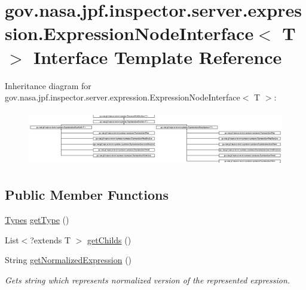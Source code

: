 \hypertarget{interfacegov_1_1nasa_1_1jpf_1_1inspector_1_1server_1_1expression_1_1_expression_node_interface}{}\section{gov.\+nasa.\+jpf.\+inspector.\+server.\+expression.\+Expression\+Node\+Interface$<$ T $>$ Interface Template Reference}
\label{interfacegov_1_1nasa_1_1jpf_1_1inspector_1_1server_1_1expression_1_1_expression_node_interface}
Inheritance diagram for gov.\+nasa.\+jpf.\+inspector.\+server.\+expression.\+Expression\+Node\+Interface$<$ T $>$\+:\begin{figure}[H]
\begin{center}
\leavevmode
\includegraphics[height=2.400000cm]{interfacegov_1_1nasa_1_1jpf_1_1inspector_1_1server_1_1expression_1_1_expression_node_interface}
\end{center}
\end{figure}
\subsection*{Public Member Functions}
\begin{DoxyCompactItemize}
\item 
\hyperlink{enumgov_1_1nasa_1_1jpf_1_1inspector_1_1server_1_1expression_1_1_types}{Types} \hyperlink{interfacegov_1_1nasa_1_1jpf_1_1inspector_1_1server_1_1expression_1_1_expression_node_interface_a5799ecbb793f24840fa3e2eaedc799aa}{get\+Type} ()
\item 
List$<$?extends T $>$ \hyperlink{interfacegov_1_1nasa_1_1jpf_1_1inspector_1_1server_1_1expression_1_1_expression_node_interface_aaeec5305da52fbad211a7abf22b0a854}{get\+Childs} ()
\item 
String \hyperlink{interfacegov_1_1nasa_1_1jpf_1_1inspector_1_1server_1_1expression_1_1_expression_node_interface_ae5387d8da0126c1256a786d54b9bd7ce}{get\+Normalized\+Expression} ()
\begin{DoxyCompactList}\small\item\em Gets string which represents normalized version of the represented expression. \end{DoxyCompactList}\end{DoxyCompactItemize}


